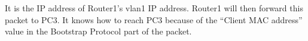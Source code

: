 It is the IP address of Router1's vlan1 IP address. Router1 will then forward this packet to PC3. It knows how to reach PC3 because of the ``Client MAC address'' value in the Bootstrap Protocol part of the packet.
